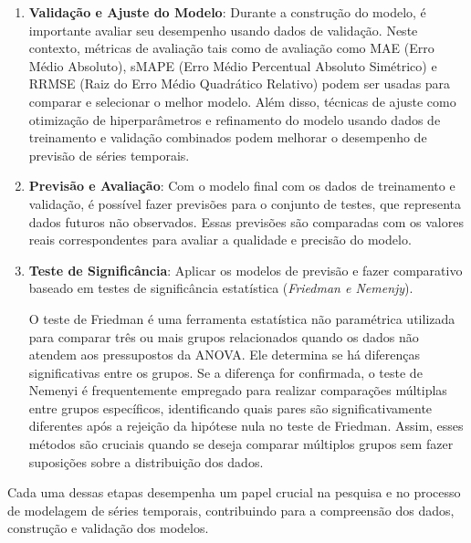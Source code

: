 \begin{enumerate}[start=1, label={\textbf{Etapa} \arabic*}]
	\item \label{etp:6} \textbf{Validação e Ajuste do Modelo}: Durante a construção do modelo, é importante avaliar seu desempenho usando dados de validação. Neste contexto, métricas de avaliação tais como de avaliação como MAE (Erro Médio Absoluto), sMAPE (Erro Médio Percentual Absoluto Simétrico) e RRMSE (Raiz do Erro Médio Quadrático Relativo) podem ser usadas para comparar e selecionar o melhor modelo. Além disso, técnicas de ajuste como otimização de hiperparâmetros e refinamento do modelo usando dados de treinamento e validação combinados podem melhorar o desempenho de previsão de séries temporais.
	
	\item \label{etp:7} \textbf{Previsão e Avaliação}: Com o modelo final com os dados de treinamento e validação, é possível fazer previsões para o conjunto de testes, que representa dados futuros não observados. Essas previsões são comparadas com os valores reais correspondentes para avaliar a qualidade e precisão do modelo.
	
	\item \label{etp:8} \textbf{Teste de Significância}: Aplicar os modelos de previsão e fazer comparativo baseado em testes de significância estatística (\textit{Friedman e Nemenjy}).
	
	O teste de Friedman é uma ferramenta estatística não paramétrica utilizada para comparar três ou mais grupos relacionados quando os dados não atendem aos pressupostos da ANOVA. Ele determina se há diferenças significativas entre os grupos. Se a diferença for confirmada, o teste de Nemenyi é frequentemente empregado para realizar comparações múltiplas entre grupos específicos, identificando quais pares são significativamente diferentes após a rejeição da hipótese nula no teste de Friedman. Assim, esses métodos são cruciais quando se deseja comparar múltiplos grupos sem fazer suposições sobre a distribuição dos dados.

	
\end{enumerate}

Cada uma dessas etapas desempenha um papel crucial na pesquisa e no processo de modelagem de séries temporais, contribuindo para a compreensão dos dados, construção e validação dos modelos.




    